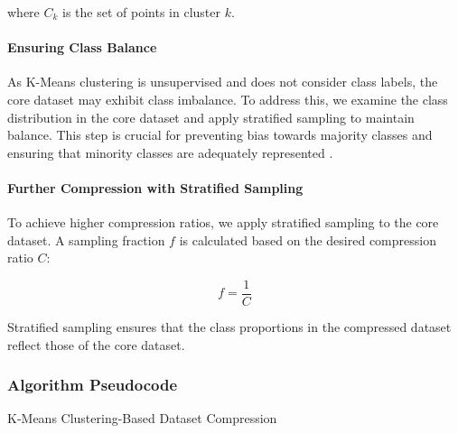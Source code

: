 \documentclass{article}
\begin{document}
where $C_k$ is the set of points in cluster $k$.

\paragraph{Ensuring Class Balance}

As K-Means clustering is unsupervised and does not consider class labels, the core dataset may exhibit class imbalance. To address this, we examine the class distribution in the core dataset and apply stratified sampling to maintain balance. This step is crucial for preventing bias towards majority classes and ensuring that minority classes are adequately represented \cite{he2009learning}.

\paragraph{Further Compression with Stratified Sampling}

To achieve higher compression ratios, we apply stratified sampling to the core dataset. A sampling fraction $f$ is calculated based on the desired compression ratio $C$:

\begin{equation}
f = \frac{1}{C}
\end{equation}

Stratified sampling ensures that the class proportions in the compressed dataset reflect those of the core dataset.

\subsubsection{Algorithm Pseudocode}

\begin{algorithm}[H]
\SetAlgoLined
{}

\caption{K-Means Clustering-Based Dataset Compression}
\end{algorithm}
\end{document}
